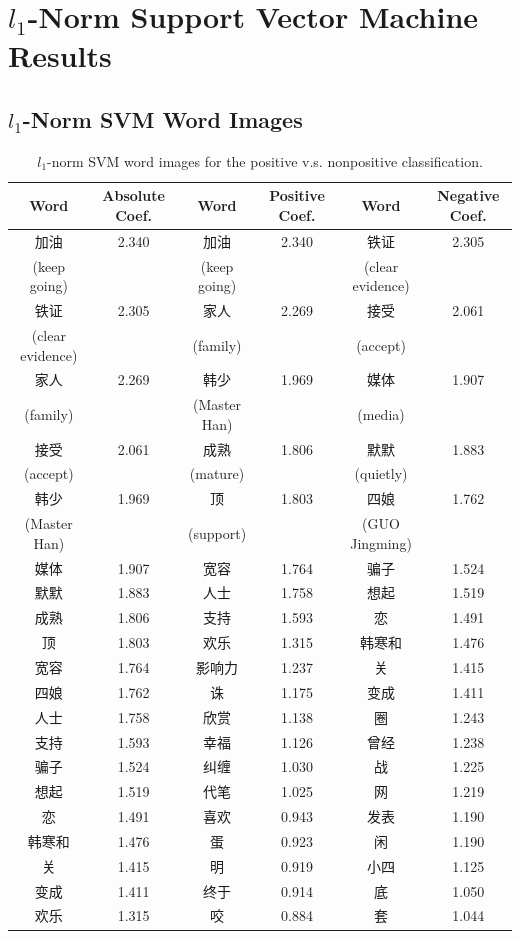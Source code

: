 \documentclass[11pt]{article}
\newcommand{\1}[1]{{\mathbf 1}\left\{#1\right\}}        %
\begin{document}
\clearpage
\newpage
\section{$l_1$-Norm Support Vector Machine Results}


\subsection{$l_1$-Norm SVM Word Images}\label{asec:svmwordimages}



\begin{table}[!h]
\caption{$l_1$-norm SVM word images for the positive v.s. nonpositive classification.}
\centering
\begin{tabular}{|c|c||c|c||c|c|}
\hline
Word & Absolute Coef. & Word & Positive Coef. & Word & Negative Coef.\\ \hline \hline
加油 & 2.340 & 加油 & 2.340 & 铁证 & 2.305\\
(keep going) & & (keep going) & & (clear evidence) & \\\hline
铁证 & 2.305 & 家人 & 2.269 & 接受 & 2.061\\
(clear evidence) & & (family) & & (accept) & \\\hline
家人 & 2.269 & 韩少 & 1.969 & 媒体 & 1.907\\
(family) & & (Master Han) & & (media) & \\\hline
接受 & 2.061 & 成熟 & 1.806 & 默默 & 1.883\\
(accept) & & (mature) & & (quietly) & \\\hline
韩少 & 1.969 & 顶 & 1.803 & 四娘 & 1.762\\
(Master Han) & & (support) & & (GUO Jingming) & \\\hline
媒体 & 1.907 & 宽容 & 1.764 & 骗子 & 1.524\\ \hline
默默 & 1.883 & 人士 & 1.758 & 想起 & 1.519\\ \hline
成熟 & 1.806 & 支持 & 1.593 & 恋 & 1.491\\ \hline
顶 & 1.803 & 欢乐 & 1.315 & 韩寒和 & 1.476\\ \hline
宽容 & 1.764 & 影响力 & 1.237 & 关 & 1.415\\ \hline
四娘 & 1.762 & 诛 & 1.175 & 变成 & 1.411\\ \hline
人士 & 1.758 & 欣赏 & 1.138 & 圈 & 1.243\\ \hline
支持 & 1.593 & 幸福 & 1.126 & 曾经 & 1.238\\ \hline
骗子 & 1.524 & 纠缠 & 1.030 & 战 & 1.225\\ \hline
想起 & 1.519 & 代笔 & 1.025 & 网 & 1.219\\ \hline
恋 & 1.491 & 喜欢 & 0.943 & 发表 & 1.190\\ \hline
韩寒和 & 1.476 & 蛋 & 0.923 & 闲 & 1.190\\ \hline
关 & 1.415 & 明 & 0.919 & 小四 & 1.125\\ \hline
变成 & 1.411 & 终于 & 0.914 & 底 & 1.050\\ \hline
欢乐 & 1.315 & 咬 & 0.884 & 套 & 1.044\\ \hline
\end{tabular}
\label{tb:svmfullpos}
\end{table}
\end{document}
